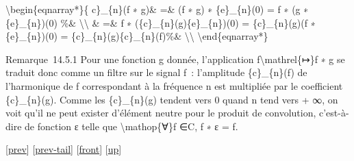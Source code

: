\documentclass[]{article}
\begin{document}
\textbackslash{}begin\{eqnarray*\}\{ c\}\_\{n\}(f ∗ g)\& =\& (f ∗ g) ∗
\{e\}\_\{n\}(0) = f ∗ (g ∗ \{e\}\_\{n\})(0) \%\&
\textbackslash{}\textbackslash{} \& =\& f ∗
(\{c\}\_\{n\}(g)\{e\}\_\{n\})(0) = \{c\}\_\{n\}(g)(f ∗ \{e\}\_\{n\})(0)
= \{c\}\_\{n\}(g)\{c\}\_\{n\}(f)\%\& \textbackslash{}\textbackslash{}
\textbackslash{}end\{eqnarray*\}

Remarque~14.5.1 Pour une fonction g donnée, l'application
f\textbackslash{}mathrel\{↦\}f ∗ g se traduit donc comme un filtre sur
le signal f~: l'amplitude \{c\}\_\{n\}(f) de l'harmonique de f
correspondant à la fréquence n est multipliée par le coefficient
\{c\}\_\{n\}(g). Comme les \{c\}\_\{n\}(g) tendent vers 0 quand
\textbar{}n\textbar{} tend vers + ∞, on voit qu'il ne peut exister
d'élément neutre pour le produit de convolution, c'est-à-dire de
fonction ε telle que \textbackslash{}mathop\{∀\}f ∈C, f ∗ ε = f.

{[}\href{coursse80.html}{prev}{]}
{[}\href{coursse80.html\#tailcoursse80.html}{prev-tail}{]}
{[}\href{coursse81.html}{front}{]}
{[}\href{coursch15.html\#coursse81.html}{up}{]}
\end{document}
